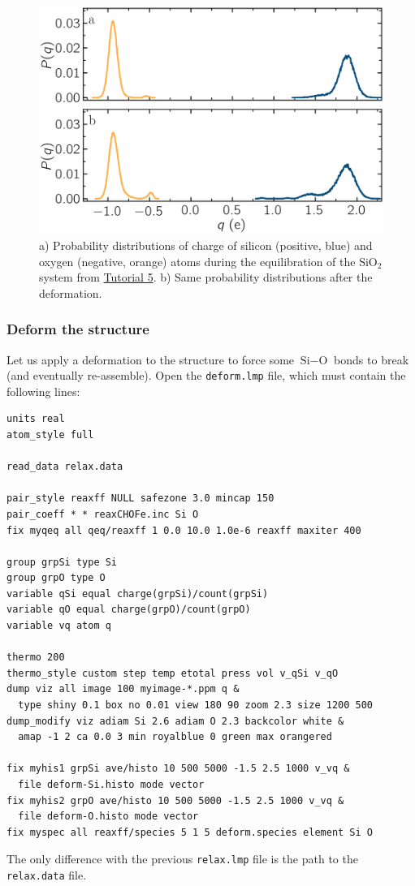 \documentclass[9pt,tutorial]{livecoms}
\newcommand{\flecmd}[1]{\textcolor{command}{\texttt{#1}}} %
\begin{document}
\begin{figure}
\includegraphics[width=\linewidth]{SIO-distribution}
\caption{a) Probability distributions of charge of silicon (positive, blue) and oxygen
(negative, orange) atoms during the equilibration of the $\text{SiO}_2$ system
from \hyperref[reactive-silicon-dioxide-label]{Tutorial 5}.  b) Same probability distributions
after the deformation.}
\label{fig:SIO-distribution}
\end{figure}

\subsubsection{Deform the structure}

Let us apply a deformation to the structure to force some $\text{Si}-\text{O}$
bonds to break (and eventually re-assemble).  Open the \flecmd{deform.lmp}
file, which must contain the following lines:
\begin{lstlisting}
units real
atom_style full

read_data relax.data

pair_style reaxff NULL safezone 3.0 mincap 150
pair_coeff * * reaxCHOFe.inc Si O
fix myqeq all qeq/reaxff 1 0.0 10.0 1.0e-6 reaxff maxiter 400

group grpSi type Si
group grpO type O
variable qSi equal charge(grpSi)/count(grpSi)
variable qO equal charge(grpO)/count(grpO)
variable vq atom q

thermo 200
thermo_style custom step temp etotal press vol v_qSi v_qO
dump viz all image 100 myimage-*.ppm q &
  type shiny 0.1 box no 0.01 view 180 90 zoom 2.3 size 1200 500
dump_modify viz adiam Si 2.6 adiam O 2.3 backcolor white &
  amap -1 2 ca 0.0 3 min royalblue 0 green max orangered

fix myhis1 grpSi ave/histo 10 500 5000 -1.5 2.5 1000 v_vq &
  file deform-Si.histo mode vector
fix myhis2 grpO ave/histo 10 500 5000 -1.5 2.5 1000 v_vq &
  file deform-O.histo mode vector
fix myspec all reaxff/species 5 1 5 deform.species element Si O
\end{lstlisting}
The only difference with the previous \flecmd{relax.lmp} file is the path to
the \flecmd{relax.data} file.
\end{document}

